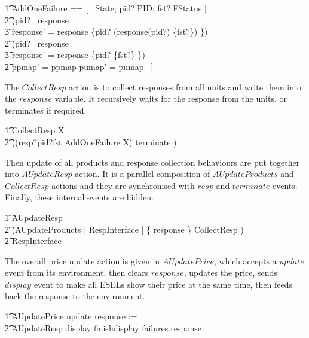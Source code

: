 \begin{zed}
    \t1 AddOneFailure == [~ \Delta State; pid?:PID; fst?:FStatus | \\
        \t2 (pid? \in \dom~response \implies \\
            \t3 response' = response \oplus \{pid? \mapsto (response(pid?) \cup \{fst?\}) \}) \land \\
        \t2 (pid? \notin \dom~response \implies \\
            \t3 response' = response \cup \{pid? \mapsto \{fst?\} \}) \land \\
        \t2 ppmap' = ppmap \land pumap' = pumap ~]
\end{zed}
The $CollectResp$ action is to collect responses from all units and write them into the $response$ variable. It recursively waits for the response from the units, or terminates if required.
\begin{circusaction}
        \t1 CollectResp \circdef \circmu X \circspot \\
            \t2 ((resp?pid?fst \then \lschexpract AddOneFailure \rschexpract \circseq X) \extchoice terminate \then \Skip) \\
\end{circusaction}

Then update of all products and response collection behaviours are put together into $AUpdateResp$ action. It is a parallel composition of $AUpdateProducts$ and $CollectResp$ actions and they are synchronised with $resp$ and $terminate$ events. Finally, these internal events are hidden.
\begin{circusaction}
        \t1 AUpdateResp \circdef \\
        \t2 (AUpdateProducts \lpar \emptyset | RespInterface | \{ response \} \rpar CollectResp ) \\
        \t2 \circhide RespInterface \\
\end{circusaction}

The overall price update action is given in $AUpdatePrice$, which accepts a $update$ event from its environment, then clears $response$, updates the price, sends $display$ event to make all ESELs show their price at the same time, then feeds back the response to the environment.
\begin{circusaction}
        \t1 AUpdatePrice \circdef update \then response := \emptyset \circseq \\
            \t2 AUpdateResp \circseq display \then finishdisplay \then failures.response \then \Skip \\ 
\end{circusaction}

